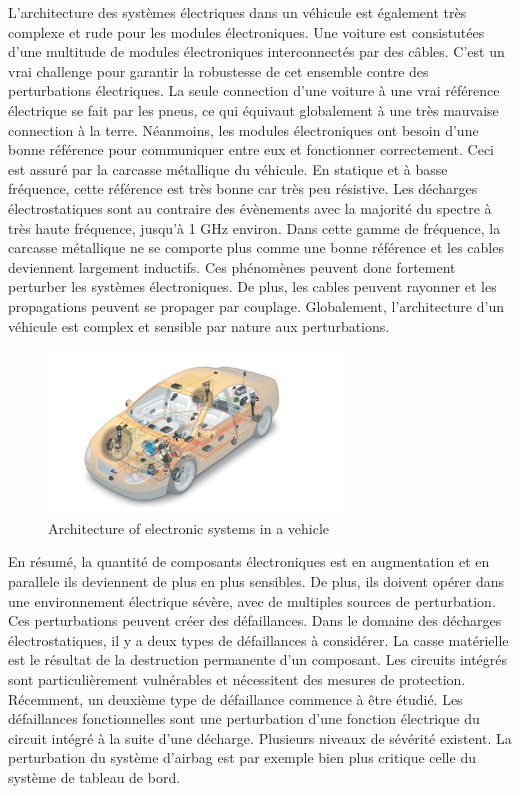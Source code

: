 L'architecture des systèmes électriques dans un véhicule est également très complexe et rude pour les modules électroniques.
Une voiture est consistutées d'une multitude de modules électroniques interconnectés par des câbles.
C'est un vrai challenge pour garantir la robustesse de cet ensemble contre des perturbations électriques.
La seule connection d'une voiture à une vrai référence électrique se fait par les pneus, ce qui équivaut globalement à une très mauvaise connection à la terre.
Néanmoins, les modules électroniques ont besoin d'une bonne référence pour communiquer entre eux et fonctionner correctement.
Ceci est assuré par la carcasse métallique du véhicule.
En statique et à basse fréquence, cette référence est très bonne car très peu résistive.
Les décharges électrostatiques sont au contraire des évènements avec la majorité du spectre à très haute fréquence, jusqu'à 1 GHz environ.
Dans cette gamme de fréquence, la carcasse métallique ne se comporte plus comme une bonne référence et les cables deviennent largement inductifs.
Ces phénomènes peuvent donc fortement perturber les systèmes électroniques.
De plus, les cables peuvent rayonner et les propagations peuvent se propager par couplage.
Globalement, l'architecture d'un véhicule est complex et sensible par nature aux perturbations.

\begin{figure}[!h]
  \centering
  \includegraphics[width=0.7\textwidth]{src/1/figures/systemintegration_01_uv-data.jpg}
  \caption{Architecture of electronic systems in a vehicle \cite{car-architecture}}
  \label{fig:car-architecture}
\end{figure}

En résumé, la quantité de composants électroniques est en augmentation et en parallele ils deviennent de plus en plus sensibles.
De plus, ils doivent opérer dans une environnement électrique sévère, avec de multiples sources de perturbation.
Ces perturbations peuvent créer des défaillances.
Dans le domaine des décharges électrostatiques, il y a deux types de défaillances à considérer.
La casse matérielle est le résultat de la destruction permanente d'un composant.
Les circuits intégrés sont particulièrement vulnérables \cite{impactESDsemiconductors} et nécessitent des mesures de protection.
Récemment, un deuxième type de défaillance commence à être étudié.
Les défaillances fonctionnelles sont une perturbation d'une fonction électrique du circuit intégré à la suite d'une décharge.
Plusieurs niveaux de sévérité existent.
La perturbation du système d'airbag est par exemple bien plus critique celle du système de tableau de bord.

